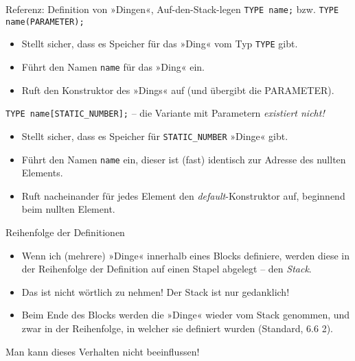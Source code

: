 \begin{frame}[fragile]{Referenz: Definition von »Dingen«, Auf-den-Stack-legen}
	\verb|TYPE name;| \hspace{1em} bzw. \hspace{1em} \verb|TYPE name(PARAMETER);|
	\begin{itemize}
		\item Stellt sicher, dass es Speicher für das »Ding« vom Typ \verb|TYPE| gibt.
		\item Führt den Namen \verb|name| für das »Ding« ein.
		\item Ruft den Konstruktor des »Dings« auf (und übergibt die PARAMETER).
	\end{itemize}
	
	\vspace{1em}
	
	\verb|TYPE name[STATIC_NUMBER];| -- die Variante mit Parametern \emph{existiert nicht!}
	\begin{itemize}
		\item Stellt sicher, dass es Speicher für \verb|STATIC_NUMBER| »Dinge« gibt.
		\item Führt den Namen \verb|name| ein, dieser ist (fast) identisch zur Adresse des nullten Elements.
		\item Ruft nacheinander für jedes Element den \emph{default}-Konstruktor auf, beginnend beim nullten Element.
	\end{itemize}
\end{frame}

\begin{frame}{Reihenfolge der Definitionen}
	\begin{itemize}
		\item Wenn ich (mehrere) »Dinge« innerhalb eines Blocks definiere, werden diese in der Reihenfolge der Definition auf einen Stapel abgelegt -- den \emph{Stack}.
		\item Das ist nicht wörtlich zu nehmen! Der Stack ist nur gedanklich!
		\item Beim Ende des Blocks werden die »Dinge« wieder vom Stack genommen, und zwar in der Reihenfolge, in welcher sie definiert wurden (Standard, 6.6 2).
	\end{itemize}
	
	\pause
	\vspace{1em}
	
	Man kann dieses Verhalten nicht beeinflussen!
\end{frame}

